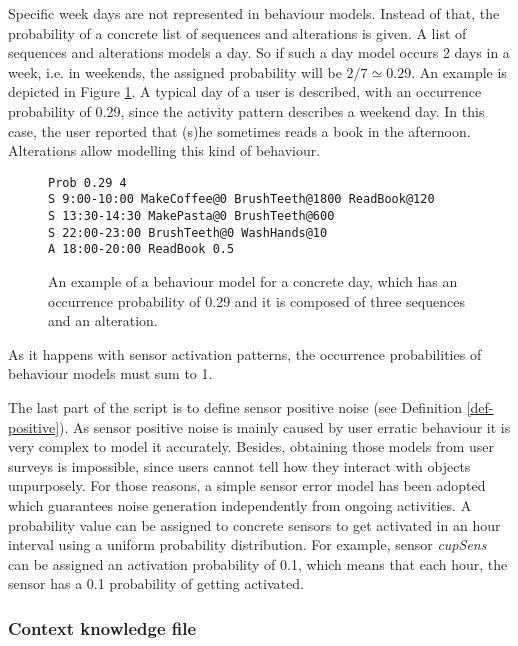 Specific week days are not represented in behaviour models. Instead of that, the probability of a concrete list of sequences and alterations is given. A list of sequences and alterations models a day. So if such a day model occurs 2 days in a week, i.e. in weekends, the assigned probability will be $2/7 \simeq 0.29$. An example is depicted in Figure \ref{fig:activity-pattern}. A typical day of a user is described, with an occurrence probability of 0.29, since the activity pattern describes a weekend day. In this case, the user reported that (s)he sometimes reads a book in the afternoon. Alterations allow modelling this kind of behaviour.


\begin{figure}[htbp]
\begin{small}
\lstset{linewidth=\textwidth}
\begin{lstlisting}
Prob 0.29 4
S 9:00-10:00 MakeCoffee@0 BrushTeeth@1800 ReadBook@120
S 13:30-14:30 MakePasta@0 BrushTeeth@600
S 22:00-23:00 BrushTeeth@0 WashHands@10
A 18:00-20:00 ReadBook 0.5
\end{lstlisting}
\end{small}
\caption{An example of a behaviour model for a concrete day, which has an occurrence probability of 0.29 and it is composed of three sequences and an alteration.}
\label{fig:activity-pattern}
\end{figure}

As it happens with sensor activation patterns, the occurrence probabilities of behaviour models must sum to 1.

The last part of the script is to define sensor positive noise (see Definition \ref{def-positive}). As sensor positive noise is mainly caused by user erratic behaviour it is very complex to model it accurately. Besides, obtaining those models from user surveys is impossible, since users cannot tell how they interact with objects unpurposely. For those reasons, a simple sensor error model has been adopted which guarantees noise generation independently from ongoing activities. A probability value can be assigned to concrete sensors to get activated in an hour interval using a uniform probability distribution. For example, sensor \textit{cupSens} can be assigned an activation probability of 0.1, which means that each hour, the sensor has a 0.1 probability of getting activated. 

\subsubsection*{Context knowledge file}

